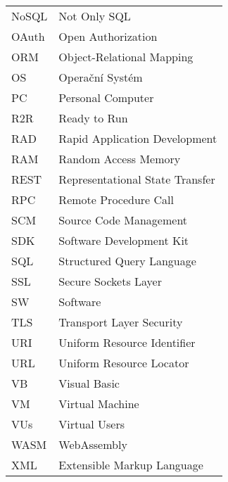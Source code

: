 \begin{tabular}{ll}
NoSQL & Not Only SQL \\
OAuth & Open Authorization \\
ORM & Object-Relational Mapping \\
OS & Operační Systém \\
PC & Personal Computer \\
R2R & Ready to Run \\
RAD & Rapid Application Development \\
RAM & Random Access Memory \\
REST & Representational State Transfer \\
RPC & Remote Procedure Call \\
SCM & Source Code Management \\
SDK & Software Development Kit \\
SQL & Structured Query Language \\
SSL & Secure Sockets Layer \\
SW & Software \\
TLS & Transport Layer Security \\
URI & Uniform Resource Identifier \\
URL & Uniform Resource Locator \\
VB & Visual Basic \\
VM & Virtual Machine \\
VUs & Virtual Users \\
WASM & WebAssembly \\
XML & Extensible Markup Language \\
\end{tabular}

